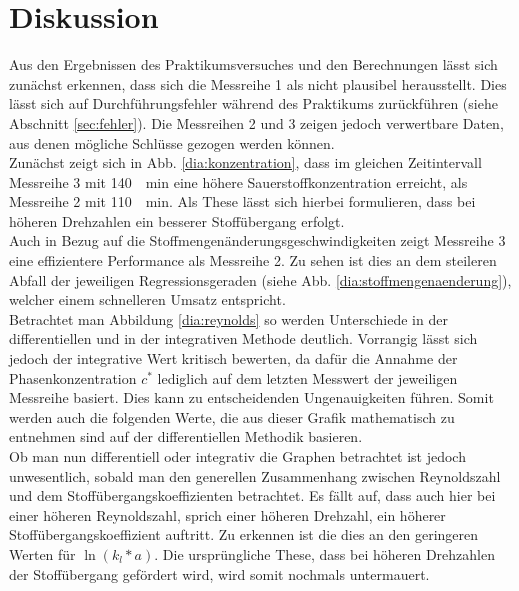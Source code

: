 \newpage
\section{Diskussion}
\label{sec:diskussion}
Aus den Ergebnissen des Praktikumsversuches und den Berechnungen lässt sich zunächst erkennen, dass sich die Messreihe 1 als nicht plausibel herausstellt. Dies lässt sich auf Durchführungsfehler während des Praktikums zurückführen (siehe Abschnitt \ref{sec:fehler}). Die Messreihen 2 und 3 zeigen jedoch verwertbare Daten, aus denen mögliche Schlüsse gezogen werden können.\\

Zunächst zeigt sich in Abb. \ref{dia:konzentration}, dass im gleichen Zeitintervall Messreihe 3 mit \SI{140}{\per \minute} eine höhere Sauerstoffkonzentration erreicht, als Messreihe 2 mit \SI{110}{\per \minute}. Als These lässt sich hierbei formulieren, dass bei höheren Drehzahlen ein besserer Stoffübergang erfolgt.\\

Auch in Bezug auf die Stoffmengenänderungsgeschwindigkeiten zeigt Messreihe 3 eine effizientere Performance als Messreihe 2. Zu sehen ist dies an dem steileren Abfall der jeweiligen Regressionsgeraden (siehe Abb. \ref{dia:stoffmengenaenderung}), welcher einem schnelleren Umsatz entspricht.\\

Betrachtet man Abbildung \ref{dia:reynolds} so werden Unterschiede in der differentiellen und in der integrativen Methode deutlich. Vorrangig lässt sich jedoch der integrative Wert kritisch bewerten, da dafür die Annahme der Phasenkonzentration $c^\ast$ lediglich auf dem letzten Messwert der jeweiligen Messreihe basiert. Dies kann zu entscheidenden Ungenauigkeiten führen. Somit werden auch die folgenden Werte, die aus dieser Grafik mathematisch zu entnehmen sind auf der differentiellen Methodik basieren. \\
Ob man nun differentiell oder integrativ die Graphen betrachtet ist jedoch unwesentlich, sobald man den generellen Zusammenhang zwischen Reynoldszahl und dem Stoffübergangskoeffizienten betrachtet. Es fällt auf, dass auch hier bei einer höheren Reynoldszahl, sprich einer höheren Drehzahl, ein höherer Stoffübergangskoeffizient auftritt. Zu erkennen ist die dies an den geringeren Werten für $\ln\left(k_l*a\right)$.
Die ursprüngliche These, dass bei höheren Drehzahlen der Stoffübergang gefördert wird, wird somit nochmals untermauert.\\

